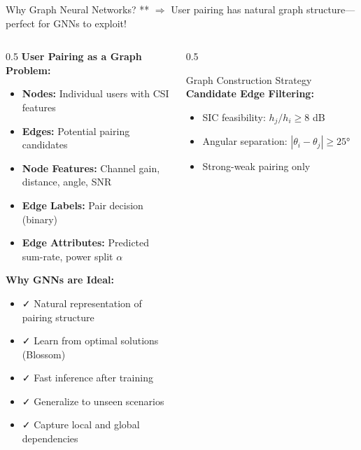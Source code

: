 \documentclass[aspectratio=169]{beamer}
\begin{document}
\begin{frame}{Why Graph Neural Networks?}
    \vspace{-0.15cm}
    \small \textcolor{iiitblue}{ ** $\Rightarrow$ User pairing has natural graph structure—perfect for GNNs to exploit!}
    
    \begin{columns}
        \begin{column}{0.5\textwidth}
            \textbf{User Pairing as a Graph Problem:}
            \begin{itemize}
                \item \textbf{Nodes:} Individual users with CSI features
                \item \textbf{Edges:} Potential pairing candidates
                \item \textbf{Node Features:} Channel gain, distance, angle, SNR
                \item \textbf{Edge Labels:} Pair decision (binary)
                \item \textbf{Edge Attributes:} Predicted sum-rate, power split $\alpha$
            \end{itemize}
            
        
            
            \textbf{Why GNNs are Ideal:}
            \begin{itemize}
                \item ✓ Natural representation of pairing structure
                \item ✓ Learn from optimal solutions (Blossom)
                \item ✓ Fast inference after training
                \item ✓ Generalize to unseen scenarios
                \item ✓ Capture local and global dependencies
            \end{itemize}
        \end{column}

        \begin{column}{0.5\textwidth}        \vspace{-.8cm}
            \begin{block}{Graph Construction Strategy}
                \textbf{Candidate Edge Filtering:}
                \begin{itemize}
                    \item SIC feasibility: $h_j/h_i \geq 8$ dB
                    \item Angular separation: $|\theta_i - \theta_j| \geq 25°$
                    \item Strong-weak pairing only
                \end{itemize}
                

\end{block}
\end{column}
\end{columns}
\end{frame}
\end{document}
